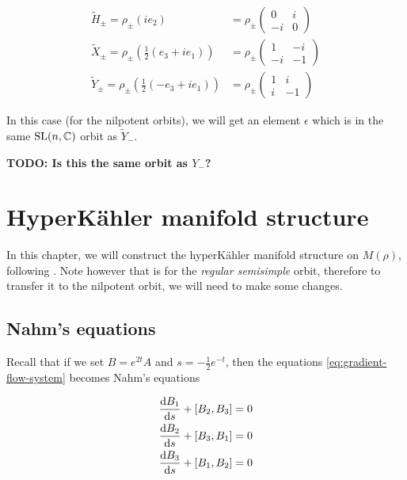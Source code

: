 \documentclass{report}
\begin{document}
\begin{align*}
    \tilde H_\pm = \rho_\pm(ie_2) &= \rho_\pm\begin{pmatrix}
        0 & i \\
        -i & 0
    \end{pmatrix} \\
    \tilde X_\pm = \rho_\pm\left(\frac{1}{2}(e_3 + ie_1)\right) &= \rho_\pm\begin{pmatrix}
        1 & -i \\
        -i & -1
    \end{pmatrix} \\
    \tilde Y_\pm = \rho_\pm\left(\frac12(-e_3 + ie_1)\right) &= \rho_\pm\begin{pmatrix}
        1 & i \\
        i & -1
    \end{pmatrix}
\end{align*}

In this case (for the nilpotent orbits), we will get an element \(\epsilon\) which is in the same \(\operatorname{SL}(n, \mathbb{C})\) orbit as \(\tilde Y_-\).

\textbf{TODO: Is this the same orbit as \(Y_-\)?}

\chapter{HyperK\"ahler manifold structure}

In this chapter, we will construct the hyperK\"ahler manifold structure on \(M(\rho)\), following \cite{kronheimer_hyper-kahlerian_1990}. Note however that \cite{kronheimer_hyper-kahlerian_1990} is for the \emph{regular semisimple} orbit, therefore to transfer it to the nilpotent orbit, we will need to make some changes.

\section{Nahm's equations}

Recall that if we set \(B = e^{2t}A\) and \(s = -\frac12e^{-t}\), then the equations \cref{eq:gradient-flow-system} becomes Nahm's equations

\begin{equation}
    \label{eq:nahm}
    \begin{split}
        \dv{B_1}{s} + [B_2, B_3] &= 0 \\
        \dv{B_2}{s} + [B_3, B_1] &= 0 \\
        \dv{B_3}{s} + [B_1, B_2] &= 0
    \end{split}
\end{equation}
\end{document}
